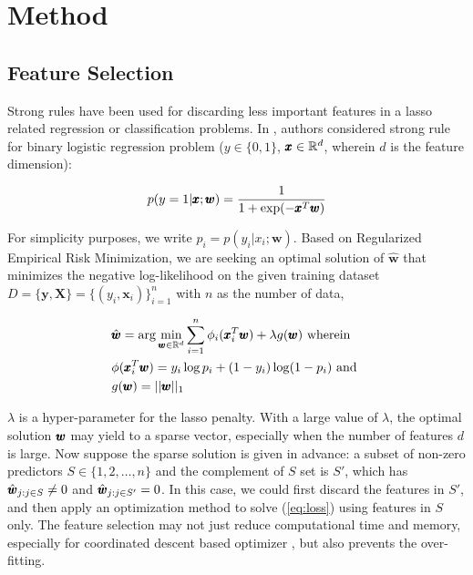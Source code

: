 \section{Method}
\subsection{Feature Selection}
Strong rules have been used for discarding less important features in a lasso related regression or classification problems\cite{tibshirani2012strong,ghaoui2010safe}. In \cite{tibshirani2012strong}, authors considered strong rule for binary logistic regression problem ($y \in \{0, 1\}$, $\pmb{x} \in \mathbb{R}^{d}$, wherein $d$ is the feature dimension):

\begin{align}
    p(y=1 | \pmb{x}; \pmb{w}) = \frac{1}{1 + \exp(-\pmb{x}^T\pmb{w})}
\end{align}

For simplicity purposes, we write $p_i = p(y_i | x_i; \pmb{w})$. Based on Regularized Empirical Risk Minimization, we are seeking an optimal solution of $\hat{\pmb{w}}$ that minimizes the negative log-likelihood on the given training dataset $D=  \{\pmb{y}, \pmb{X}\} = \{(y_i, \pmb{x}_i)\}_{i=1}^{n}$ with $n$ as the number of data,

\begin{align}
    &\hat{\pmb{w}} = \arg \min_{\pmb{w}\in \mathbb{R}^{d}} \sum_{i=1}^n {\phi_i(\pmb{x}_i^T\pmb{w}) + \lambda g(\pmb{w})} \text{ wherein} \label{eq:loss} \\
    &\phi(\pmb{x}_i^T\pmb{w}) = y_i \log p_i + (1-y_i) \log (1-p_i) \text{ and } \\
    &g(\pmb{w}) = ||\pmb{w}||_1
\end{align}

$\lambda$ is a hyper-parameter for the lasso penalty. With a large value of $\lambda$, the optimal solution $\pmb{w}$ may yield to a sparse vector, especially when the number of features $d$ is large. Now suppose the sparse solution is given in advance: a subset of non-zero predictors $S \in \{1,2,\dots,n\}$ and the complement of $S$ set is $S'$, which has $\hat{\pmb{w}}_{j: j \in S} \neq 0$ and $\hat{\pmb{w}}_{j: j \in S'} = 0$. In this case, we could first discard the features in $S'$, and then apply an optimization method to solve (\ref{eq:loss}) using features in $S$ only. The feature selection may not just reduce computational time and memory, especially for coordinated descent based optimizer \cite{friedman2010regularization}, but also prevents the over-fitting. 

